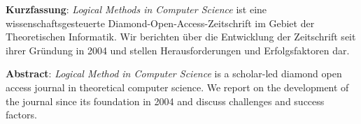 \textbf{Kurzfassung}: \emph{Logical Methods in Computer Science} ist
eine wissenschaftsgesteuerte Diamond-Open-Access-Zeitschrift im Gebiet
der Theoretischen Informatik. Wir berichten über die Entwicklung der
Zeitschrift seit ihrer Gründung in 2004 und stellen Herausforderungen
und Erfolgsfaktoren dar.

\textbf{Abstract}: \emph{Logical Method in Computer Science} is a
scholar-led diamond open access journal in theoretical computer science.
We report on the development of the journal since its foundation in 2004
and discuss challenges and success factors.
